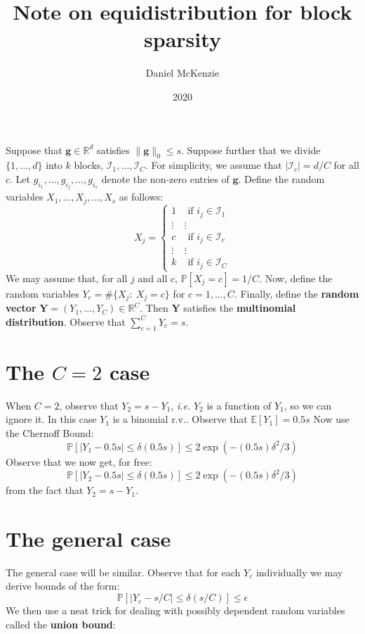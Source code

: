 \documentclass{article}
\title{Note on equidistribution for block sparsity}
\author{Daniel McKenzie}
\date{2020}
\begin{document}
\maketitle

Suppose that $\mathbf{g}\in\mathbb{R}^{d}$ satisfies $\|\mathbf{g}\|_0 \leq s$. Suppose further that we divide $\{1,\ldots, d\}$ into $k$ blocks, $\mathcal{I}_1,\ldots, \mathcal{I}_{C}$. For simplicity, we assume that $|\mathcal{I}_{c}| = d/C$ for all $c$. Let $g_{i_1},\ldots, g_{i_j},\ldots, g_{i_s}$ denote the non-zero entries of $\mathbf{g}$. Define the random variables $X_1,\ldots, X_j, \ldots, X_s$ as follows:
$$
X_j = \left\{\begin{array}{cc} 1 & \text{ if } i_j \in \mathcal{I}_1 \\ \vdots & \vdots \\ c & \text{ if } i_j \in \mathcal{I}_{c} \\ \vdots & \vdots \\ k & \text{ if } i_j \in \mathcal{I}_{C} \end{array}\right.
$$
We may assume that, for all $j$ and all $c$, $\mathbb{P}[X_{j} = c] = 1/C$. Now, define the random variables $Y_{c} = \# \{X_j: \ X_j = c \}$ for $c = 1,\ldots, C$. Finally, define the {\bf random vector} $\mathbf{Y} = (Y_1,\ldots, Y_{C}) \in\mathbb{R}^{C}$. Then $\mathbf{Y}$ satisfies the {\bf multinomial distribution}. Observe that $\sum_{c=1}^{C}Y_{c} = s$. \\

\section{The $C = 2$ case}

When $C = 2$, observe that $Y_{2} = s - Y_{1}$, {\em i.e.} $Y_{2}$ is a function of $Y_1$, so we can ignore it. In this case $Y_{1}$ is a binomial r.v.. Observe that $\mathbb{E}[Y_{1}] = 0.5s$ Now use the Chernoff Bound:
$$
\mathbb{P}\left[ \left|Y_{1} - 0.5s\right| \leq \delta(0.5s)\right] \leq 2\exp\left( - (0.5s)\delta^{2}/3\right)
$$
Observe that we now get, for free:
$$
\mathbb{P}\left[ \left|Y_{2} - 0.5s\right| \leq \delta(0.5s)\right] \leq 2\exp\left( - (0.5s)\delta^{2}/3\right)
$$
from the fact that $Y_{2} = s - Y_{1}$.

\section{The general case}
The general case will be similar. Observe that for each $Y_{c}$ individually we may derive bounds of the form:
$$
\mathbb{P}\left[\left| Y_{c} - s/C\right| \leq \delta(s/C)\right] \leq \epsilon
$$
We then use a neat trick for dealing with possibly dependent random variables called the {\bf union bound}:
\end{document}
